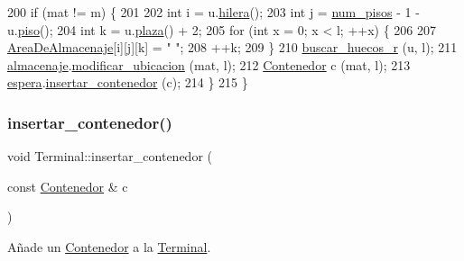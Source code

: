 \begin{DoxyCode}
200     \textcolor{keywordflow}{if} (mat != m) \{
201         
202         \textcolor{keywordtype}{int} i = u.\hyperlink{class_ubicacion_abf00d08075e75ac833de7357ebc6f521}{hilera}();
203         \textcolor{keywordtype}{int} j = \hyperlink{class_terminal_ad6cdee7fe26b4443d45b0a18c345a86d}{num\_pisos} - 1 - u.\hyperlink{class_ubicacion_af6099f8de4dee993e4c9119e1f879070}{piso}();
204         \textcolor{keywordtype}{int} k = u.\hyperlink{class_ubicacion_abed323ffb2eace375e80bc395fdaeb39}{plaza}() + 2;
205         \textcolor{keywordflow}{for} (\textcolor{keywordtype}{int} x = 0; x < l; ++x) \{
206     
207             \hyperlink{class_terminal_a50670862a5cdeb0504efd1c45b6416dc}{AreaDeAlmacenaje}[i][j][k] = \textcolor{stringliteral}{" "};
208             ++k;
209         \}
210         \hyperlink{class_terminal_a56204987306ed811046d3ade11fff2cb}{buscar\_huecos\_r} (u, l);
211         \hyperlink{class_terminal_a1d87d7b16c4f460eee6f1ab73da90fd2}{almacenaje}.\hyperlink{class_almacenaje_a4e225d0899f7c49b3c513ed61f63b4ef}{modificar\_ubicacion} (mat, l);
212         \hyperlink{class_contenedor}{Contenedor} c (mat, l);
213         \hyperlink{class_terminal_ac9f71207d73c8d05a9d9d6c046f9f8c3}{espera}.\hyperlink{class_espera_a7154136eb8addbeebe5cc1406d6400c0}{insertar\_contenedor} (c);
214     \}
215 \}
\end{DoxyCode}
\mbox{\label{class_terminal_a0448a45cc3dea91ab383c79246c9e50e}} 
\subsubsection{\texorpdfstring{insertar\+\_\+contenedor()}{insertar\_contenedor()}}
{\footnotesize\ttfamily void Terminal\+::insertar\+\_\+contenedor (\begin{DoxyParamCaption}\item[{const \hyperlink{class_contenedor}{Contenedor} \&}]{c }\end{DoxyParamCaption})}



Añade un \hyperlink{class_contenedor}{Contenedor} a la \hyperlink{class_terminal}{Terminal}. 

